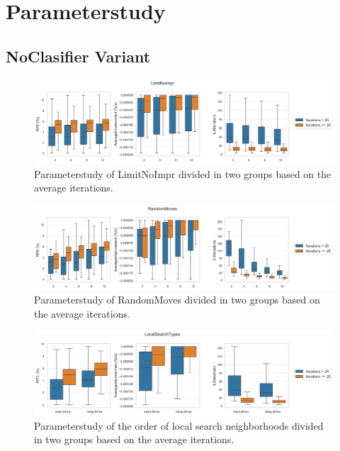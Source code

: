 \section{Parameterstudy}

\subsection{NoClasifier Variant}
\label{app:subsec:parameterstudy_noclassifier}

\begin{figure}[!ht]
    \centering
    \includegraphics[width=\textwidth]{pictures/parameter_study/LimitNoImpr_base_parameter_study.png}
    \caption{Parameterstudy of LimitNoImpr divided in two groups based on the average iterations.}
    \label{fig:parameterstudy_NoClassifier_limitNoImpr}
\end{figure}

\begin{figure}[!ht]
    \centering
    \includegraphics[width=\textwidth]{pictures/parameter_study/RandomMoves_base_parameter_study.png}
    \caption{Parameterstudy of RandomMoves divided in two groups based on the average iterations.}
    \label{fig:parameterstudy_NoClassifier_RandomMoves}
\end{figure}

\begin{figure}[!ht]
    \centering
    \includegraphics[width=\textwidth]{pictures/parameter_study/LocalSearchTypes_base_parameter_study.png}
    \caption{Parameterstudy of the order of local search neighborhoods divided in two groups based on the average iterations.}
    \label{fig:parameterstudy_NoClassifier_localSearch}
\end{figure}

